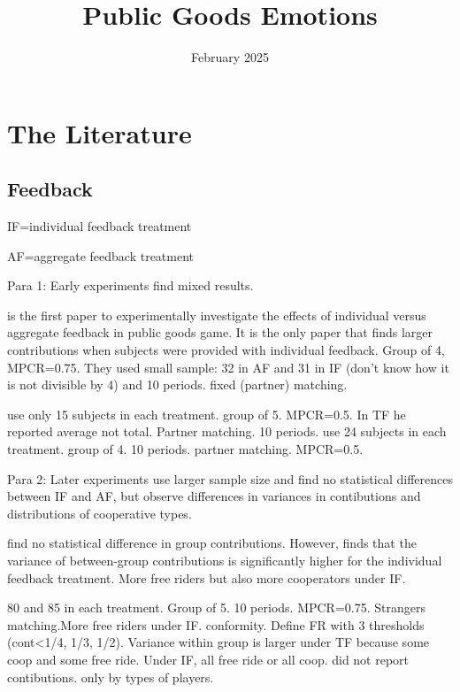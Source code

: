 \documentclass[11pt]{article}
\title{Public Goods Emotions}
\date{February 2025}
\begin{document}
\maketitle






\section{The Literature}


\subsection{Feedback}

IF=individual feedback treatment

AF=aggregate feedback treatment

Para 1: Early experiments find mixed results. 

\cite{sell1991levels} is the first paper to experimentally  investigate the effects of individual versus aggregate feedback in public goods game. It is the only paper that finds larger contributions when subjects were provided with individual feedback. Group of 4, MPCR=0.75. They used small sample: 32 in AF and 31  in IF (don't know how it is not divisible by 4) and  10 periods. fixed (partner) matching.

\cite{weimann1994individual} use only 15 subjects in each treatment. group of 5. MPCR=0.5. In TF he reported  average not total. Partner matching. 10 periods. \cite{croson2001feedback} use 24 subjects in each treatment. group of 4. 10 periods. partner matching. MPCR=0.5.


Para 2: Later experiments use larger sample size and  find no statistical differences between IF and AF, but observe differences in variances in contibutions and distributions of cooperative types. 

\cite{croson2001feedback} find no statistical difference in group contributions. However, \cite{croson2001feedback} finds that the variance of between-group contributions is significantly higher for the individual feedback treatment. More free riders but also more cooperators under IF.


\cite{carpenter2004rome} 80 and 85 in each treatment.  Group of 5. 10 periods. MPCR=0.75. Strangers matching.More free riders under IF. conformity. Define FR with 3 thresholds (cont<1/4, 1/3, 1/2). Variance within group is larger under TF because some coop and some free ride. Under IF, all free ride or all coop. did not report contibutions. only by types of players.
\end{document}
